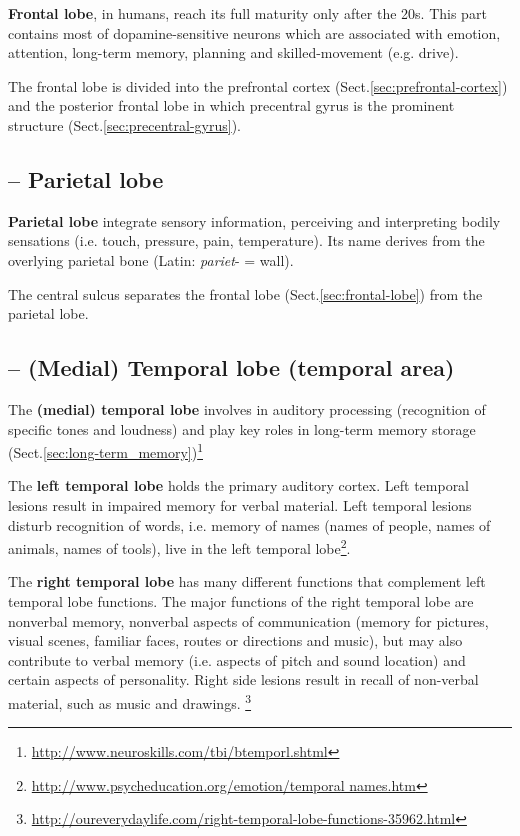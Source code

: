 {\bf Frontal lobe}, in humans, reach its full maturity only after the
20s. This part contains most of dopamine-sensitive neurons which are
associated with emotion, attention, long-term memory, planning and
skilled-movement (e.g. drive). 

The frontal lobe is divided into the prefrontal cortex
(Sect.\ref{sec:prefrontal-cortex}) and the posterior frontal lobe in which
precentral gyrus is the prominent structure (Sect.\ref{sec:precentral-gyrus}).

\subsection{-- Parietal lobe}
\label{sec:parietal-lobe}
\label{sec:posterior-lobe}

{\bf Parietal lobe} integrate sensory information, perceiving and interpreting
bodily sensations (i.e. touch, pressure, pain, temperature). Its name derives
from the overlying parietal bone (Latin: {\it pariet}- = wall).

The central sulcus separates the frontal lobe (Sect.\ref{sec:frontal-lobe}) from
the parietal lobe.


\subsection{-- (Medial) Temporal lobe (temporal area)}
\label{sec:temporal-lobe}

The {\bf (medial) temporal lobe} involves in auditory processing (recognition
of specific tones and loudness) and play key roles in long-term memory
storage
(Sect.\ref{sec:long-term_memory})\footnote{\url{http://www.neuroskills.com/tbi/btemporl.shtml}}

The {\bf left temporal lobe} holds the primary auditory cortex.
Left temporal lesions result in impaired memory for verbal material.
Left temporal lesions disturb recognition of words, i.e. memory of names (names
of people, names of animals, names of tools), live in the left temporal
lobe\footnote{\url{http://www.psycheducation.org/emotion/temporal names.htm}}.

The {\bf right temporal lobe} has many different functions that complement left
temporal lobe functions. The major functions of the right temporal lobe are
nonverbal memory, nonverbal aspects of communication (memory for pictures,
visual scenes, familiar faces, routes or directions and music), but may also
contribute to verbal memory (i.e. aspects of pitch and sound location) and
certain aspects of personality. Right side lesions result in recall of
non-verbal material, such as music and drawings.
\footnote{\url{http://oureverydaylife.com/right-temporal-lobe-functions-35962.html}}

